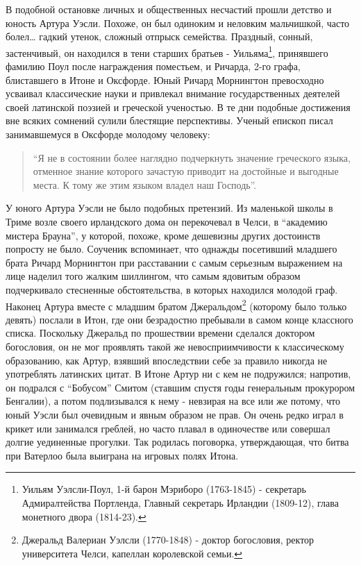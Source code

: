 \documentclass[
  oneside,
  12pt,
  titlepage]{book}
\begin{document}
В подобной остановке личных и общественных несчастий прошли детство и юность Артура Уэсли. Похоже, он был одиноким и неловким мальчишкой, часто болел\ldots{} гадкий утенок, сложный отпрыск семейства. Праздный, сонный, застенчивый, он находился в тени старших братьев - Уильяма\footnote{Уильям Уэлсли-Поул, 1-й барон Мэриборо (1763-1845) - секретарь Адмиралтейства Портленда, Главный секретарь Ирландии (1809-12), глава монетного двора (1814-23).}, принявшего фамилию Поул после награждения поместьем, и Ричарда, 2-го графа, блиставшего в Итоне и Оксфорде. Юный Ричард Морнингтон превосходно усваивал классические науки и привлекал внимание государственных деятелей своей латинской поэзией и греческой ученостью. В те дни подобные достижения вне всяких сомнений сулили блестящие перспективы. Ученый епископ писал занимавшемуся в Оксфорде молодому человеку:

\begin{quote}
``Я не в состоянии более наглядно подчеркнуть значение греческого языка, отменное знание которого зачастую приводит на достойные и выгодные места. К тому же этим языком владел наш Господь''.
\end{quote}

У юного Артура Уэсли не было подобных претензий. Из маленькой школы в Триме возле своего ирландского дома он перекочевал в Челси, в ``академию мистера Брауна'', у которой, похоже, кроме дешевизны других достоинств попросту не было. Соученик вспоминает, что однажды посетивший младшего брата Ричард Морнингтон при расставании с самым серьезным выражением на лице наделил того жалким шиллингом, что самым ядовитым образом подчеркивало стесненные обстоятельства, в которых находился молодой граф. Наконец Артура вместе с младшим братом Джеральдом\footnote{Джеральд Валериан Уэлсли (1770-1848) - доктор богословия, ректор университета Челси, капеллан королевской семьи.} (которому было только девять) послали в Итон, где они безрадостно пребывали в самом конце классного списка. Поскольку Джеральд по прошествии времени сделался доктором богословия, он не мог проявлять такой же невосприимчивости к классическому образованию, как Артур, взявший впоследствии себе за правило никогда не употреблять латинских цитат. В Итоне Артур ни с кем не подружился; напротив, он подрался с ``Бобусом'' Смитом (ставшим спустя годы генеральным прокурором Бенгалии), а потом подлизывался к нему - невзирая на все или же потому, что юный Уэсли был очевидным и явным образом не прав. Он очень редко играл в крикет или занимался греблей, но часто плавал в одиночестве или совершал долгие уединенные прогулки. Так родилась поговорка, утверждающая, что битва при Ватерлоо была выиграна на игровых полях Итона.
\end{document}
